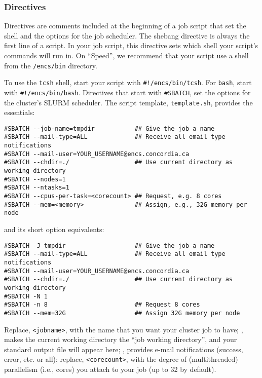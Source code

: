 \subsubsection{Directives}
\label{sect:directives}

Directives are comments included at the beginning of a job script that set the shell 
and the options for the job scheduler. 
%
The shebang directive is always the first line of a script. In your job script, 
this directive sets which shell your script's commands will run in. On ``Speed'', 
we recommend that your script use a shell from the \texttt{/encs/bin} directory. 

To use the \texttt{tcsh} shell, start your script with \verb|#!/encs/bin/tcsh|.
%
For \texttt{bash}, start with \verb|#!/encs/bin/bash|.
%
Directives that start with \verb|#SBATCH|, set the options for the cluster's 
SLURM scheduler. The script template, \texttt{template.sh}, 
provides the essentials:

\begin{verbatim}
#SBATCH --job-name=tmpdir           ## Give the job a name
#SBATCH --mail-type=ALL             ## Receive all email type notifications
#SBATCH --mail-user=YOUR_USERNAME@encs.concordia.ca
#SBATCH --chdir=./                  ## Use current directory as working directory
#SBATCH --nodes=1
#SBATCH --ntasks=1
#SBATCH --cpus-per-task=<corecount> ## Request, e.g. 8 cores
#SBATCH --mem=<memory>              ## Assign, e.g., 32G memory per node 
\end{verbatim}

and its short option equivalents:

\begin{verbatim}
#SBATCH -J tmpdir                   ## Give the job a name
#SBATCH --mail-type=ALL             ## Receive all email type notifications
#SBATCH --mail-user=YOUR_USERNAME@encs.concordia.ca
#SBATCH --chdir=./                  ## Use current directory as working directory
#SBATCH -N 1
#SBATCH -n 8                        ## Request 8 cores
#SBATCH --mem=32G                   ## Assign 32G memory per node 
\end{verbatim}

Replace, \verb+<jobname>+, with the name that you want your cluster job to have;
, makes the current working directory the ``job working directory'',
and your standard output file will appear here; , provides e-mail
notifications (success, error, etc. or all); replace, \verb+<corecount>+, with the degree of
(multithreaded) parallelism (i.e., cores) you attach to your job (up to 32 by default).

